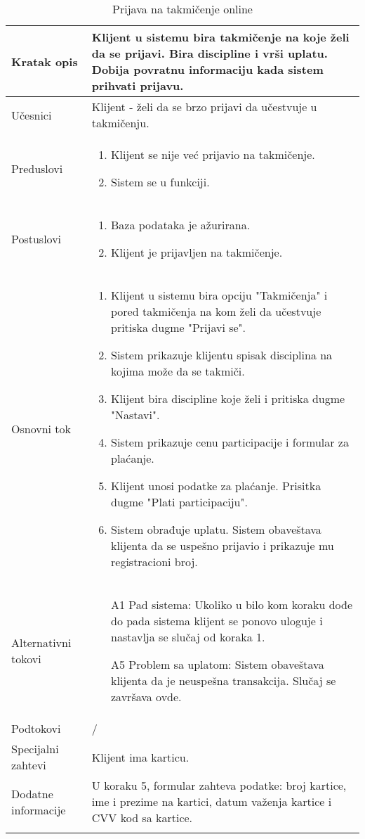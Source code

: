 \documentclass[../../main.tex]{subfiles}
\begin{document}
\begin{longtable}{| p{} | p{} |} 
\hline
    Kratak opis & Klijent u sistemu bira takmičenje na koje želi da se prijavi. Bira discipline i vrši uplatu. Dobija povratnu informaciju kada sistem prihvati prijavu. \\ 
\hline    
    Učesnici & Klijent - želi da se brzo prijavi da učestvuje u takmičenju.\\
\hline
   Preduslovi & \begin{enumerate}
       \item Klijent se nije već prijavio na takmičenje.
       \item Sistem se u funkciji.
   \end{enumerate}\\
\hline  
    Postuslovi & \begin{enumerate}
        \item Baza podataka je ažurirana.
        \item Klijent je prijavljen na takmičenje.
    \end{enumerate}\\
\hline
    Osnovni tok & \begin{enumerate}
        \item Klijent u sistemu bira opciju "Takmičenja" i pored takmičenja na kom želi da učestvuje pritiska dugme "Prijavi se".
        \item Sistem prikazuje klijentu spisak disciplina na kojima može da se takmiči.
        \item Klijent bira discipline koje želi i pritiska dugme "Nastavi".
        \item Sistem prikazuje cenu participacije i formular za plaćanje.
        \item Klijent unosi podatke za plaćanje. Prisitka dugme "Plati participaciju".
        \item Sistem obrađuje uplatu. Sistem obaveštava klijenta da se uspešno prijavio i prikazuje mu registracioni broj.
    \end{enumerate}\\
\hline
    Alternativni tokovi & \begin{itemize}
        \item[A1] Pad sistema: Ukoliko u bilo kom koraku dođe do pada sistema klijent se ponovo uloguje i nastavlja se slučaj od koraka 1.
        \item[A5] Problem sa uplatom: Sistem obaveštava klijenta da je neuspešna transakcija. Slučaj se završava ovde. 
    \end{itemize}\\
\hline
    Podtokovi & /\\
\hline
    Specijalni zahtevi & Klijent ima karticu.\\
\hline
    Dodatne informacije & U koraku 5, formular zahteva podatke: broj kartice, ime i prezime na kartici, datum važenja kartice i CVV kod sa kartice.\\
\hline
\caption{Prijava na takmičenje online} %
\end{longtable}
\end{document}
